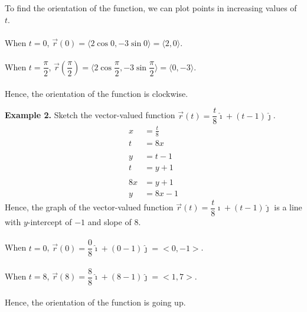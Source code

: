To find the orientation of the function, we can plot points in increasing
values of $t$. \\\\ \noindent When $t = 0$, $\vec{r}(0) = \langle 2\cos 0,
    -3\sin 0 \rangle = \langle 2, 0 \rangle$. \\\\ \noindent When $t =
    \dfrac{\pi}{2}$, $\vec{r}\left(\dfrac{\pi}{2}\right) = \langle 2\cos
    \dfrac{\pi}{2}, -3\sin \dfrac{\pi}{2} \rangle = \langle 0, -3 \rangle$. \\\\
\noindent Hence, the orientation of the function is clockwise. \vspace{2em}
\begin{center}
\end{center}
\newpage
\noindent\textbf{Example 2. } Sketch the vector-valued function $\vec{r}(t) = \dfrac{t}{8}\hat{\imath} + (t - 1)\hat{\jmath}$.
\begin{align*}
    x  & = \frac{t}{8} \\
    t  & = 8x          \\
    \\
    y  & = t - 1       \\
    t  & = y + 1       \\
    \\
    8x & = y + 1       \\
    y  & = 8x - 1
\end{align*}
Hence, the graph of the vector-valued function $\vec{r}(t) = \dfrac{t}{8}\hat{\imath} + (t - 1)\hat{\jmath}$ is a line with $y$-intercept of $-1$ and slope of $8$.
\\\\
When $t = 0$, $\vec{r}(0) = \dfrac{0}{8}\hat{\imath} + (0 - 1)\hat{\jmath} = <0, -1>$. \\\\ When $t = 8$, $\vec{r}(8) = \dfrac{8}{8}\hat{\imath} + (8 - 1)\hat{\jmath} = <1, 7>$. \\\\ Hence, the orientation of the function is going up.
